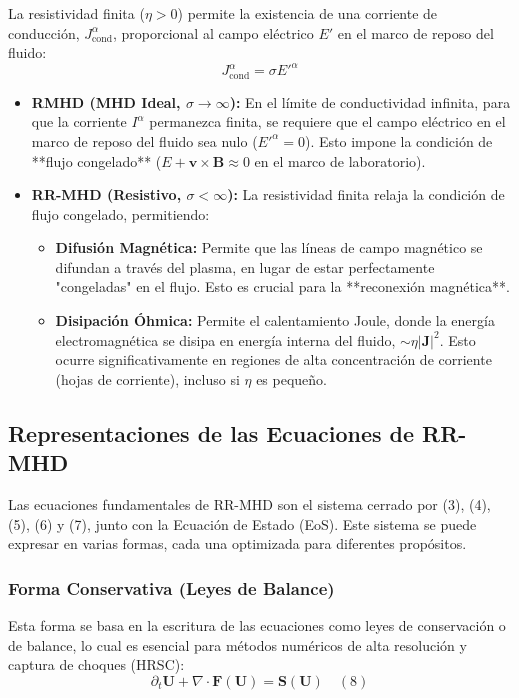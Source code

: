 La resistividad finita ($\eta > 0$) permite la existencia de una corriente de conducción, $J^{\alpha}_{\text{cond}}$, proporcional al campo eléctrico $E'$ en el marco de reposo del fluido:
$$ J^{\alpha}_{\text{cond}} = \sigma E'^\alpha $$

\begin{itemize}
    \item \textbf{RMHD (MHD Ideal, $\sigma \to \infty$):} En el límite de conductividad infinita, para que la corriente $I^\alpha$ permanezca finita, se requiere que el campo eléctrico en el marco de reposo del fluido sea nulo ($E'^\alpha = 0$). Esto impone la condición de **flujo congelado** ($E + \mathbf{v} \times \mathbf{B} \approx 0$ en el marco de laboratorio).
    \item \textbf{RR-MHD (Resistivo, $\sigma < \infty$):} La resistividad finita relaja la condición de flujo congelado, permitiendo:
    \begin{itemize}
        \item \textbf{Difusión Magnética:} Permite que las líneas de campo magnético se difundan a través del plasma, en lugar de estar perfectamente "congeladas" en el flujo. Esto es crucial para la **reconexión magnética**.
        \item \textbf{Disipación Óhmica:} Permite el calentamiento Joule, donde la energía electromagnética se disipa en energía interna del fluido, $\sim \eta |\mathbf{J}|^2$. Esto ocurre significativamente en regiones de alta concentración de corriente (hojas de corriente), incluso si $\eta$ es pequeño.
    \end{itemize}
\end{itemize}

\subsection{Representaciones de las Ecuaciones de RR-MHD}

Las ecuaciones fundamentales de RR-MHD son el sistema cerrado por (3), (4), (5), (6) y (7), junto con la Ecuación de Estado (EoS). Este sistema se puede expresar en varias formas, cada una optimizada para diferentes propósitos.

\subsubsection{Forma Conservativa (Leyes de Balance)}

Esta forma se basa en la escritura de las ecuaciones como leyes de conservación o de balance, lo cual es esencial para métodos numéricos de alta resolución y captura de choques (HRSC):
\begin{equation}
\partial_t \mathbf{U} + \nabla \cdot \mathbf{F}(\mathbf{U}) = \mathbf{S}(\mathbf{U}) \quad (8)
\end{equation}


